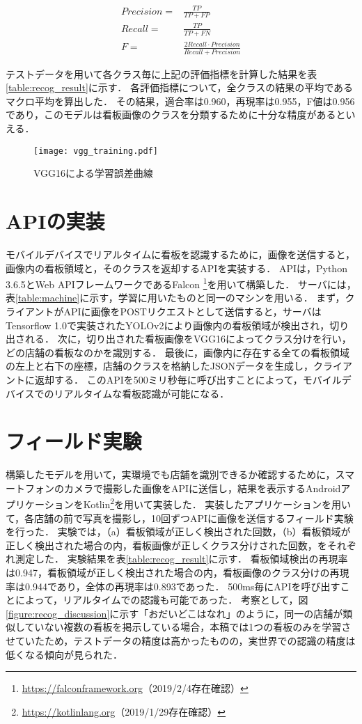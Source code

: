     \begin{align}
      Precision = &\frac{TP}{TP+FP} \\
      Recall = &\frac{TP}{TP+FN} \\
      F = &\frac{2 Recall \cdot Precision}{Recall + Precision}
    \end{align}
    
    テストデータを用いて各クラス毎に上記の評価指標を計算した結果を表\ref{table:recog_result}に示す．
    各評価指標について，全クラスの結果の平均であるマクロ平均を算出した．
    その結果，適合率は0.960，再現率は0.955，F値は0.956であり，このモデルは看板画像のクラスを分類するために十分な精度があるといえる．

    \begin{figure}[tb]
      \centerline{\texttt{[image: vgg\_training.pdf]}}
      \caption{VGG16による学習誤差曲線}
      \label{figure:vgg_training}
    \end{figure}

\section{APIの実装}
  モバイルデバイスでリアルタイムに看板を認識するために，画像を送信すると，画像内の看板領域と，そのクラスを返却するAPIを実装する．
  APIは，Python 3.6.5とWeb APIフレームワークであるFalcon \footnote{\url{https://falconframework.org}（2019/2/4存在確認）}を用いて構築した．
  サーバには，表\ref{table:machine}に示す，学習に用いたものと同一のマシンを用いる．
  まず，クライアントがAPIに画像をPOSTリクエストとして送信すると，サーバはTensorflow 1.0\cite{Abadi:2016}で実装されたYOLOv2により画像内の看板領域が検出され，切り出される．
  次に，切り出された看板画像をVGG16によってクラス分けを行い，どの店舗の看板なのかを識別する．
  最後に，画像内に存在する全ての看板領域の左上と右下の座標，店舗のクラスを格納したJSONデータを生成し，クライアントに返却する．
  このAPIを500ミリ秒毎に呼び出すことによって，モバイルデバイスでのリアルタイムな看板認識が可能になる．

\section{フィールド実験}
  構築したモデルを用いて，実環境でも店舗を識別できるか確認するために，スマートフォンのカメラで撮影した画像をAPIに送信し，結果を表示するAndroidアプリケーションをKotlin\footnote{\url{https://kotlinlang.org}（2019/1/29存在確認）}を用いて実装した．
  実装したアプリケーションを用いて，各店舗の前で写真を撮影し，10回ずつAPIに画像を送信するフィールド実験を行った．
  実験では，（a）看板領域が正しく検出された回数，（b）看板領域が正しく検出された場合の内，看板画像が正しくクラス分けされた回数，をそれぞれ測定した．
  実験結果を表\ref{table:recog_result}に示す．
  看板領域検出の再現率は0.947，看板領域が正しく検出された場合の内，看板画像のクラス分けの再現率は0.944であり，全体の再現率は0.893であった．
  500ms毎にAPIを呼び出すことによって，リアルタイムでの認識も可能であった．
  考察として，図\ref{figure:recog_discussion}に示す「おだいどこはなれ」のように，同一の店舗が類似していない複数の看板を掲示している場合，本稿では1つの看板のみを学習させていたため，テストデータの精度は高かったものの，実世界での認識の精度は低くなる傾向が見られた．

